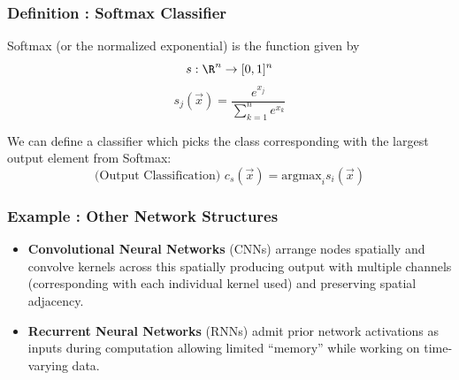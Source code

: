 \begin{frame}
{
}
\end{frame}



\begin{frame}
  \frametitle{Definition : Softmax Classifier}
\begin{definition}{Softmax (or the normalized exponential) is the function given by}
\[s : \R^n \to [0,1]^n\]
\[s_j(\vec x) = \frac{e^{x_j}}{\sum_{k = 1}^n e^{x_k}}\]
\end{definition}

\begin{definition}{We can define a classifier which picks the class corresponding with the largest output element from Softmax: }
\[\text{(Output Classification)  }   c_s(\vec x) = \text{argmax}_{i} s_i(\vec{x})\]
\end{definition}
\end{frame}



\begin{frame}
  \frametitle{Example : Other Network Structures}
  \begin{itemize}
    \item \textbf{Convolutional Neural Networks} (CNNs) arrange nodes
      spatially and convolve kernels across this spatially producing
      output with multiple channels (corresponding with each
      individual kernel used) and preserving spatial adjacency.
    \item \textbf{Recurrent Neural Networks} (RNNs) admit prior
      network activations as inputs during computation allowing 
      limited ``memory'' while working on time-varying data.
\end{itemize}
\end{frame}
      

